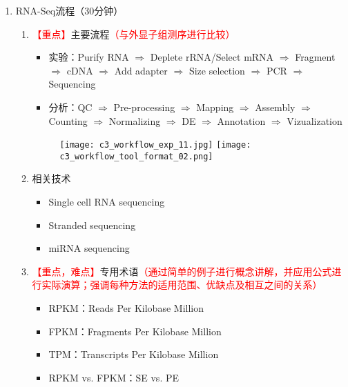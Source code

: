 \documentclass{TIJMUjiaoanLL}
\begin{document}
\begin{enumerate}
  \item RNA-Seq流程（30分钟）
    \begin{enumerate}
      \item \textcolor{red}{【重点】}主要流程\textcolor{red}{（与外显子组测序进行比较）}
        \begin{itemize}
          \item 实验：Purify RNA $\Rightarrow$ Deplete rRNA/Select mRNA $\Rightarrow$ Fragment $\Rightarrow$ cDNA $\Rightarrow$ Add adapter $\Rightarrow$ Size selection $\Rightarrow$ PCR $\Rightarrow$ Sequencing
          \item 分析：QC $\Rightarrow$ Pre-processing $\Rightarrow$ Mapping $\Rightarrow$ Assembly $\Rightarrow$ Counting $\Rightarrow$ Normalizing $\Rightarrow$ DE $\Rightarrow$ Annotation $\Rightarrow$ Vizualization
        \end{itemize}
        \vspace{-1em}
        \begin{figure}[h]
          \centering
          \texttt{[image: c3\_workflow\_exp\_11.jpg]}
          \texttt{[image: c3\_workflow\_tool\_format\_02.png]}
        \end{figure}
        \vspace{-1em}
      \item 相关技术
        \begin{itemize}
          \item Single cell RNA sequencing
          \item Stranded sequencing
          \item miRNA sequencing
        \end{itemize}
      \item \textcolor{red}{【重点，难点】}专用术语\textcolor{red}{（通过简单的例子进行概念讲解，并应用公式进行实际演算；强调每种方法的适用范围、优缺点及相互之间的关系）}
        \begin{itemize}
          \item RPKM：Reads Per Kilobase Million
          \item FPKM：Fragments Per Kilobase Million
          \item TPM：Transcripts Per Kilobase Million
          \item RPKM vs. FPKM：SE vs. PE
        \end{itemize}
    \end{enumerate}


\end{enumerate}
\end{document}
